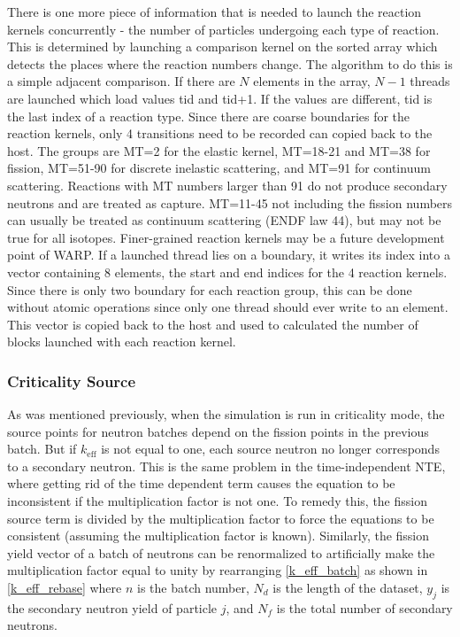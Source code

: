 There is one more piece of information that is needed to launch the reaction kernels concurrently - the number of particles undergoing each type of reaction.  This is determined by launching a comparison kernel on the sorted array which detects the places where the reaction numbers change.  The algorithm to do this is a simple adjacent comparison.  If there are $N$ elements in the array, $N-1$ threads are launched which load values tid and tid+1.  If the values are different, tid is the last index of a reaction type.  Since there are coarse boundaries for the reaction kernels, only 4 transitions need to be recorded can copied back to the host.  The groups are MT=2 for the elastic kernel, MT=18-21 and MT=38 for fission, MT=51-90 for discrete inelastic scattering, and MT=91 for continuum scattering.  Reactions with MT numbers larger than 91 do not produce secondary neutrons and are treated as capture.  MT=11-45 not including the fission numbers can usually be treated as continuum scattering (ENDF law 44), but may not be true for all isotopes.  Finer-grained reaction kernels may be a future development point of WARP.  If a launched thread lies on a boundary, it writes its index into a vector containing  8 elements, the start and end indices for the 4 reaction kernels.  Since there is only two boundary for each reaction group, this can be done without atomic operations since only one thread should ever write to an element.  This vector is copied back to the host and used to calculated the number of blocks launched with each reaction kernel.

\subsubsection{Criticality Source}

As was mentioned previously, when the simulation is run in criticality mode, the source points for neutron batches depend on the fission points in the previous batch.  But if $k_\mathrm{eff}$ is not equal to one, each source neutron no longer corresponds to a secondary neutron.  This is the same problem in the time-independent NTE, where getting rid of the time dependent term causes the equation to be inconsistent if the multiplication factor is not one.  To remedy this, the fission source term is divided by the multiplication factor to force the equations to be consistent (assuming the multiplication factor is known).  Similarly, the fission yield vector of a batch of neutrons can be renormalized to artificially make the multiplication factor equal to unity by rearranging \eqref{k_eff_batch} as shown in \eqref{k_eff_rebase} where $n$ is the batch number, $N_d$ is the length of the dataset, $y_j$ is the secondary neutron yield of particle $j$, and $N_f$ is the total number of secondary neutrons.

